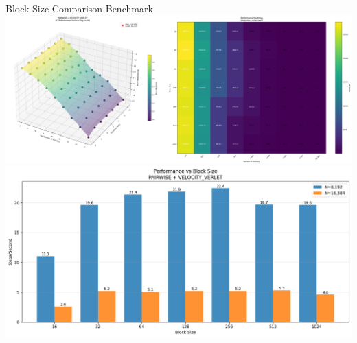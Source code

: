 \documentclass{beamer}
\begin{document}
\begin{frame}{Block-Size Comparison Benchmark}
    \centering
    \includegraphics[width=0.77\linewidth]{figures/block-size-3d.png}
    \includegraphics[width=0.77\linewidth]{figures/block_size_hist.png}
\end{frame}
\end{document}
